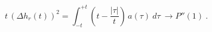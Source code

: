 \begin{equation}
t\,(\Delta h_r(t))^2 = 
\int_{-t}^{+t} \left( t-\frac{|\tau|}{t} \right)\, a(\tau)\ d\tau\ 
\rightarrow P''(1)\ .
\label{eq32}
\end{equation}

